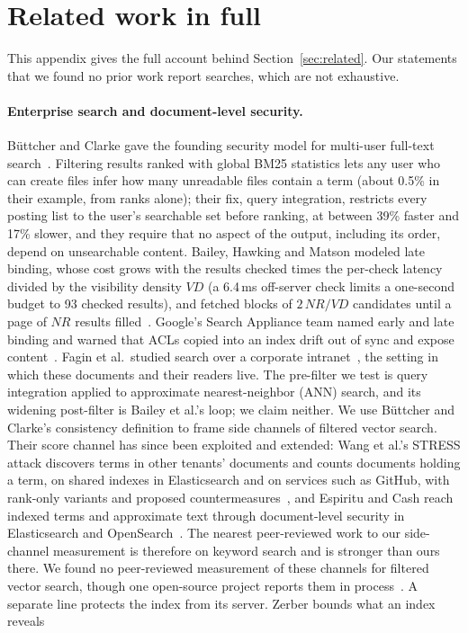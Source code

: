 
\section{Related work in full}\label{app:related}

This appendix gives the full account behind Section~\ref{sec:related}. Our statements that we found no prior work report searches, which are not exhaustive.

\paragraph{Enterprise search and document-level security.}
B\"{u}ttcher and Clarke gave the founding security model for multi-user full-text
search~\cite{buttcher2005security}. Filtering results ranked with global BM25 statistics lets any user
who can create files infer how many unreadable files contain a term (about 0.5\% in their example, from ranks
alone); their fix, query integration, restricts every posting
list to the user's searchable set before ranking, at between 39\% faster and 17\% slower, and they
require that no aspect of the output, including its order, depend on unsearchable content. Bailey,
Hawking and Matson modeled late binding, whose cost grows with the results checked times the
per-check latency divided by the visibility density $\mathit{VD}$ (a 6.4\,ms off-server check limits
a one-second budget to 93 checked results), and fetched blocks of
$2\,\mathit{NR}/\mathit{VD}$ candidates until a page of $\mathit{NR}$ results
filled~\cite{bailey2006secure}. Google's Search Appliance team named early and late binding and
warned that ACLs copied into an index drift out of sync and expose
content~\cite{mangtani2006documentlevel}. Fagin et al.\ studied search over a corporate
intranet~\cite{fagin2003searching}, the setting in which these documents and their readers live. The
pre-filter we test is query integration applied to approximate nearest-neighbor (ANN) search, and
its widening post-filter is Bailey et al.'s loop; we claim neither. We use B\"{u}ttcher and Clarke's
consistency definition to frame side channels of filtered vector search. Their score channel has since been exploited and extended: Wang et al.'s STRESS attack discovers terms in other tenants' documents and counts documents holding a term, on shared indexes in Elasticsearch and on services such as GitHub, with rank-only variants and proposed countermeasures~\cite{wang2017sidechannel}, and Espiritu and Cash reach indexed terms and approximate text through document-level security in Elasticsearch and OpenSearch~\cite{espiritu2026plaintext}. The nearest peer-reviewed work to our side-channel measurement is therefore on keyword search and is stronger than ours there. We found no peer-reviewed measurement of these channels for filtered vector search, though one open-source project reports them in process~\cite{raghuram2026onewayglass}. A separate line protects the index from its server. Zerber bounds what an index reveals

